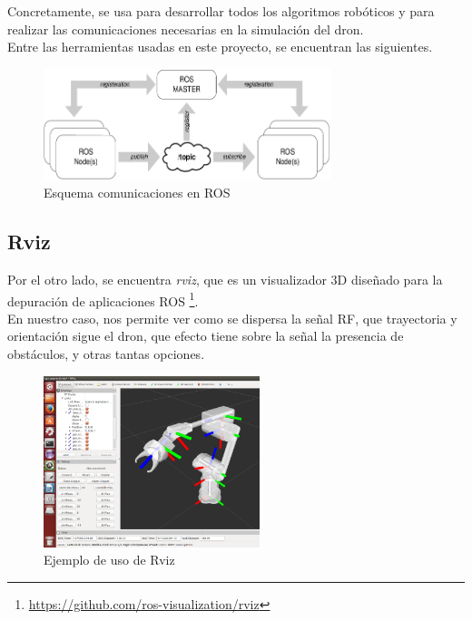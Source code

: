 Concretamente, se usa para desarrollar todos los algoritmos robóticos y para realizar las comunicaciones necesarias en la simulación del dron.\\

Entre las herramientas usadas en este proyecto, se encuentran las siguientes.

\begin{figure} [H]
	\begin{center}
	\includegraphics[height=3.25cm]{imagenes/cap3/1_ros_esquema.png}
	\end{center}
	\caption[Esquema de comunicaciones en ROS]{Esquema comunicaciones en ROS}
	\label{fig:ros}
\end{figure}

\subsection{Rviz}
\label{subsec:rviz}

Por el otro lado, se encuentra \emph{rviz}, que es un visualizador 3D diseñado para la depuración de aplicaciones \ac{ROS} \footnote[7]{\url{https://github.com/ros-visualization/rviz}}.\\

En nuestro caso, nos permite ver como se dispersa la señal \ac{RF}, que trayectoria y orientación sigue el dron, que efecto tiene sobre la señal la presencia de obstáculos, y otras tantas opciones.\\

\begin{figure} [H]
	\begin{center}
	\includegraphics[height=5cm]{imagenes/cap3/3_rviz_example.png}
	\end{center}
	\caption[Ejemplo de uso de Rviz]{Ejemplo de uso de Rviz}
	\label{fig:rviz}
\end{figure}

